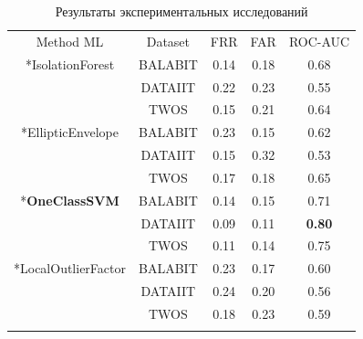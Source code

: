 \documentclass[12pt]{article}
\begin{document}
    \begin{table}[h]
        \centering
        \renewcommand{\arraystretch}{1.0}
        \renewcommand{\tabcolsep}{5mm}
        \caption{Результаты экспериментальных исследований}
        \begin{tabular}{|| c || c || c | c | c ||}
            \hhline{|t:=:t:=:t:===:t|} 
            Method ML & Dataset & FRR & FAR & ROC-AUC \\
            \hhline{|:=::=::===:|}
            \multirow{3}*{IsolationForest}      & BALABIT & 0.14 & 0.18 & \cellcolor{yellow} 0.68 \\ \hhline{||~||-||-|-|-||}
                                                & DATAIIT & 0.22 & 0.23 & \cellcolor{pink}   0.55 \\ \hhline{||~||-||-|-|-||}
                                                & TWOS    & 0.15 & 0.21 & \cellcolor{yellow} 0.64 \\ \hhline{||-||-||-|-|-||}
            \multirow{3}*{EllipticEnvelope}     & BALABIT & 0.23 & 0.15 & \cellcolor{yellow} 0.62 \\ \hhline{||~||-||-|-|-||}
                                                & DATAIIT & 0.15 & 0.32 & \cellcolor{pink}   0.53 \\ \hhline{||~||-||-|-|-||}
                                                & TWOS    & 0.17 & 0.18 & \cellcolor{yellow} 0.65 \\ \hhline{||-||-||-|-|-||}
            \multirow{3}*{\textbf{OneClassSVM}} & BALABIT & 0.14 & 0.15 & \cellcolor{lime}   0.71 \\ \hhline{||~||-||-|-|-||}
                                                & DATAIIT & 0.09 & 0.11 & \cellcolor{lime}   \textbf{0.80} \\ \hhline{||~||-||-|-|-||}
                                                & TWOS    & 0.11 & 0.14 & \cellcolor{lime}   0.75 \\ \hhline{||-||-||-|-|-||}
            \multirow{3}*{LocalOutlierFactor}   & BALABIT & 0.23 & 0.17 & \cellcolor{yellow} 0.60 \\ \hhline{||~||-||-|-|-||}
                                                & DATAIIT & 0.24 & 0.20 & \cellcolor{pink}   0.56 \\ \hhline{||~||-||-|-|-||}
                                                & TWOS    & 0.18 & 0.23 & \cellcolor{yellow} 0.59 \\
            \hhline{|b:=:b:=:b:===:b|} 
        \end{tabular}
        \label{sec:PracticalPart:table:Result}
    \end{table}
\end{document}
